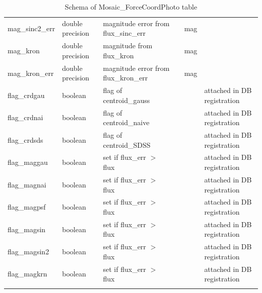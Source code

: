 \documentclass[12pt]{article}
\begin{document}
\begin{table}[thbp]
\begin{center}
{\begin{tabular}{llllll}
mag\_sinc2\_err & double precision & magnitude error from flux\_sinc\_err                    &                            & mag         &   \\
mag\_kron & double precision & magnitude from flux\_kron                            &                            & mag         &   \\
mag\_kron\_err & double precision & magnitude error from flux\_kron\_err                    &                            & mag         &   \\
flag\_crdgau & boolean & flag of centroid\_gauss                              &                            &             & attached in DB registration  \\
flag\_crdnai & boolean & flag of centroid\_naive                              &                            &             & attached in DB registration  \\
flag\_crdsds & boolean & flag of centroid\_SDSS                               &                            &             & attached in DB registration  \\
flag\_maggau & boolean & set if flux\_err $>$ flux                              &                            &             & attached in DB registration  \\
flag\_magnai & boolean & set if flux\_err $>$ flux                              &                            &             & attached in DB registration  \\
flag\_magpsf & boolean & set if flux\_err $>$ flux                              &                            &             & attached in DB registration  \\
flag\_magsin & boolean & set if flux\_err $>$ flux                              &                            &             & attached in DB registration  \\
flag\_magsin2 & boolean & set if flux\_err $>$ flux                              &                            &             & attached in DB registration  \\
flag\_magkrn & boolean & set if flux\_err $>$ flux                              &                            &             & attached in DB registration  \\
\hline\\
\end{tabular}
}
\caption{Schema of Mosaic\_ForceCoordPhoto table}
\end{center}
\end{table}
\end{document}
